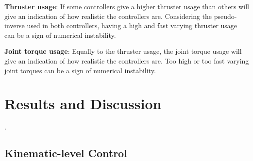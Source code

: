 \textbf{Thruster usage}: If some controllers give a higher thruster usage than others
will give an indication of how realistic the controllers are. Considering the
pseudo-inverse used in both controllers, having a high and fast varying thruster
usage can be a sign of numerical instability.

\textbf{Joint torque usage}: Equally to the thruster usage, the joint torque usage
will give an indication of how realistic the controllers are. Too high or too
fast varying joint torques can be a sign of numerical instability.

\newpage
\section{Results and Discussion}
\label{sec:simulation:results}.

\subsection{Kinematic-level Control}

